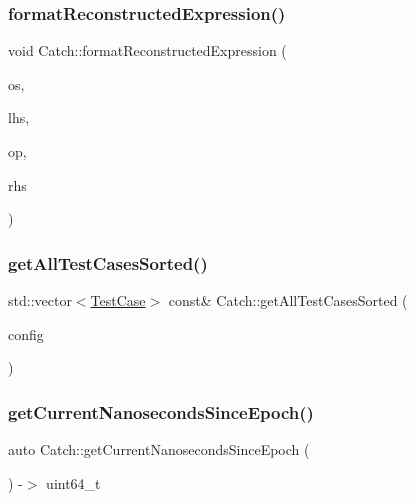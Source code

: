 \mbox{\label{namespace_catch_a520110c31f26cf9892595772ab814fc0}} 
\subsubsection{\texorpdfstring{format\+Reconstructed\+Expression()}{formatReconstructedExpression()}}
{\footnotesize\ttfamily void Catch\+::format\+Reconstructed\+Expression (\begin{DoxyParamCaption}\item[{std\+::ostream \&}]{os,  }\item[{std\+::string const \&}]{lhs,  }\item[{\mbox{\hyperlink{class_catch_1_1_string_ref}{String\+Ref}}}]{op,  }\item[{std\+::string const \&}]{rhs }\end{DoxyParamCaption})}

\mbox{\label{namespace_catch_a1c9b1a23bc947ea70ddaabf067276cf2}} 
\subsubsection{\texorpdfstring{get\+All\+Test\+Cases\+Sorted()}{getAllTestCasesSorted()}}
{\footnotesize\ttfamily std\+::vector$<$\mbox{\hyperlink{class_catch_1_1_test_case}{Test\+Case}}$>$ const\& Catch\+::get\+All\+Test\+Cases\+Sorted (\begin{DoxyParamCaption}\item[{I\+Config const \&}]{config }\end{DoxyParamCaption})}

\mbox{\label{namespace_catch_a98d058468488c486a9cb5c8463f3ba29}} 
\subsubsection{\texorpdfstring{get\+Current\+Nanoseconds\+Since\+Epoch()}{getCurrentNanosecondsSinceEpoch()}}
{\footnotesize\ttfamily auto Catch\+::get\+Current\+Nanoseconds\+Since\+Epoch (\begin{DoxyParamCaption}{ }\end{DoxyParamCaption}) -\/$>$  uint64\+\_\+t}

